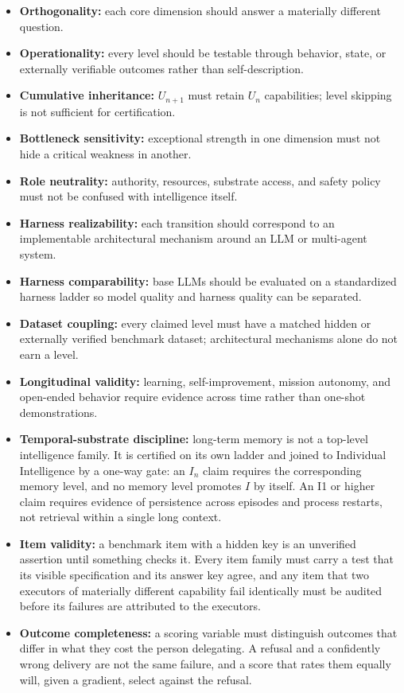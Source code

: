 \begin{itemize}
\item \textbf{Orthogonality:} each core dimension should answer a materially different question.
\item \textbf{Operationality:} every level should be testable through behavior, state, or externally verifiable outcomes rather than self-description.
\item \textbf{Cumulative inheritance:} $U_{n+1}$ must retain $U_n$ capabilities; level skipping is not sufficient for certification.
\item \textbf{Bottleneck sensitivity:} exceptional strength in one dimension must not hide a critical weakness in another.
\item \textbf{Role neutrality:} authority, resources, substrate access, and safety policy must not be confused with intelligence itself.
\item \textbf{Harness realizability:} each transition should correspond to an implementable architectural mechanism around an LLM or multi-agent system.
\item \textbf{Harness comparability:} base LLMs should be evaluated on a standardized harness ladder so model quality and harness quality can be separated.
\item \textbf{Dataset coupling:} every claimed level must have a matched hidden or externally verified benchmark dataset; architectural mechanisms alone do not earn a level.
\item \textbf{Longitudinal validity:} learning, self-improvement, mission autonomy, and open-ended behavior require evidence across time rather than one-shot demonstrations.
\item \textbf{Temporal-substrate discipline:} long-term memory is not a top-level intelligence family. It is certified on its own ladder and joined to Individual Intelligence by a one-way gate: an $I_n$ claim requires the corresponding memory level, and no memory level promotes $I$ by itself. An I1 or higher claim requires evidence of persistence across episodes and process restarts, not retrieval within a single long context.
\item \textbf{Item validity:} a benchmark item with a hidden key is an unverified assertion until something checks it. Every item family must carry a test that its visible specification and its answer key agree, and any item that two executors of materially different capability fail identically must be audited before its failures are attributed to the executors.
\item \textbf{Outcome completeness:} a scoring variable must distinguish outcomes that differ in what they cost the person delegating. A refusal and a confidently wrong delivery are not the same failure, and a score that rates them equally will, given a gradient, select against the refusal.
\end{itemize}

